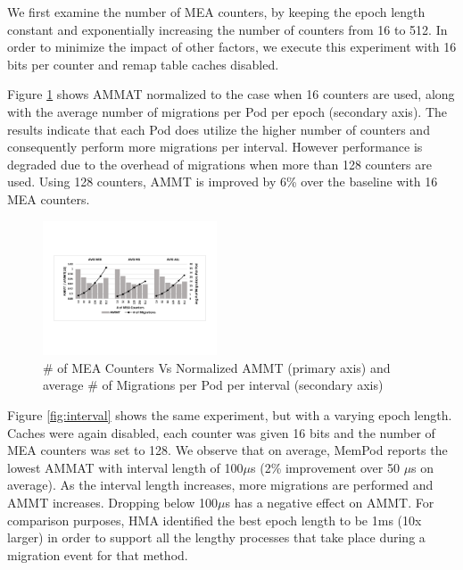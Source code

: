 

We first examine the number of MEA counters, by keeping the epoch length constant and exponentially increasing the number of counters from 16 to 512. In order to minimize the impact of other factors, we execute this experiment with 16 bits per counter and remap table caches disabled. 

Figure \ref{fig:num_counters} shows AMMAT normalized to the case when 16 counters are used, along with the average number of migrations per Pod per epoch (secondary axis). The results indicate that each Pod does utilize the higher number of counters and consequently perform more migrations per interval. However performance is degraded due to the overhead of migrations when more than 128 counters are used. Using 128 counters, AMMT is improved by 6\% over the baseline with 16 MEA counters. 

\begin{figure}[h]
	\centering
  \includegraphics[width=0.46\textwidth]{figures/avg_num_counters_normalized.pdf}
  \caption{\# of MEA Counters Vs Normalized AMMT (primary axis) and average \# of Migrations per Pod per interval (secondary axis)}
  \label{fig:num_counters}
\end{figure}

Figure \ref{fig:interval} shows the same experiment, but with a varying epoch length. Caches were again disabled, each counter was given 16 bits and the number of MEA counters was set to 128. We observe that on average, MemPod reports the lowest AMMAT with interval length of 100$\mu$s (2\% improvement over 50 $\mu$s on average). As the interval length increases, more migrations are performed and AMMT increases. Dropping below 100$\mu$s has a negative effect on AMMT. For comparison purposes, HMA \cite{meswani-HPCA21} identified the best epoch length to be 1ms (10x larger) in order to support all the lengthy processes that take place during a migration event for that method.

